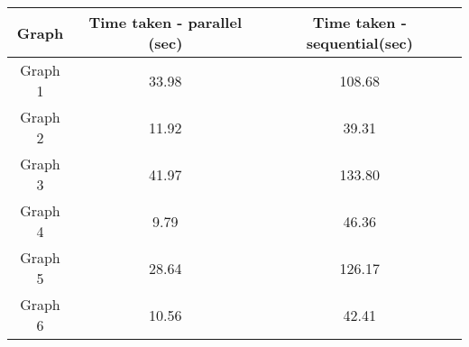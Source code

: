 \documentclass[12pt]{article}
\begin{document}
\begin{table}[h]
	\begin{center}
		\captionsetup{type=table}
		\begin{tabular}{|c|c|c|}
			\hline
			\textbf{Graph} & \textbf{Time taken - parallel (sec)} &
			\textbf{Time taken - sequential(sec)}                          \\
			\hline
			Graph 1        & 33.98                                & 108.68 \\
			Graph 2        & 11.92                                & 39.31  \\
			Graph 3        & 41.97                                & 133.80 \\
			Graph 4        & 9.79                                 & 46.36  \\
			Graph 5        & 28.64                                & 126.17 \\
			Graph 6        & 10.56                                & 42.41  \\
			\hline
		\end{tabular}
	\end{center}
\end{table}



\end{document}
